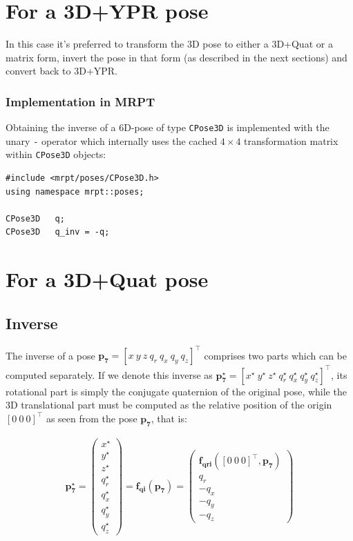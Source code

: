 \documentclass[a4paper,11pt]{report}
\begin{document}
\section{For a 3D+YPR pose}

In this case it's preferred to transform the 3D pose to either a 3D+Quat or a matrix form,
invert the pose in that form (as described in the next sections) and convert back to 3D+YPR.


\subsubsection{Implementation in MRPT}

Obtaining the inverse of a 6D-pose of type \texttt{CPose3D} is implemented
with the unary \texttt{-} operator which internally uses the cached $4 \times 4$
transformation matrix within \texttt{CPose3D} objects:

\begin{lstlisting}
#include <mrpt/poses/CPose3D.h>
using namespace mrpt::poses;

CPose3D   q;
CPose3D   q_inv = -q;
\end{lstlisting}




\section{For a 3D+Quat pose}
\label{sect:inverse:quat}

\subsection{Inverse}

The inverse of a pose $\mathbf{p_7} = [x ~ y ~ z ~  q_r ~ q_x ~ q_y ~ q_z ] ^ \top$
comprises two parts which can be computed separately.
If we denote this inverse as $\mathbf{p^\star_7} = [x^\star ~ y^\star ~ z^\star ~  q^\star_r ~ q^\star_x ~ q^\star_y ~ q^\star_z ] ^ \top$,
its rotational part is simply the conjugate quaternion of the original pose, while the 3D translational
part must be computed as the relative position of the origin $[0 ~ 0 ~ 0]^\top$ as seen
from the pose $\mathbf{p_7}$, that is:

\begin{eqnarray}
\mathbf{p^\star_7} =
\left(
\begin{array}{c}
x^\star \\ y^\star \\ z^\star \\  q^\star_r \\ q^\star_x \\ q^\star_y \\ q^\star_z
\end{array}
\right)
=
\mathbf{f_{qi}}( \mathbf{p_7} )
=
\left(
\begin{array}{c}
\mathbf{f_{qri}}( [0 ~ 0 ~ 0]^\top, \mathbf{p_7} )
\\  q_r \\ -q_x \\ -q_y \\ -q_z
\end{array}
\right)
\end{eqnarray}
\end{document}
